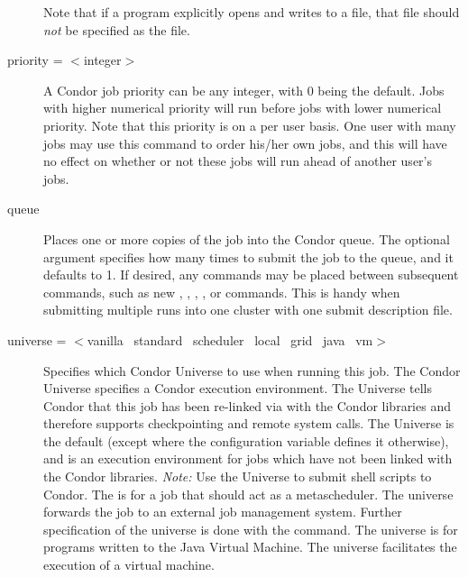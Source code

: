 \begin{description}
Note that if a program explicitly opens and writes to a file,
that file should \emph{not} be specified as the  file.


\item[priority = $<$integer$>$] 
\label{man-condor-submit-priority}
A Condor job priority 
can be any integer, with 0 being the default.
Jobs with higher numerical priority will
run before jobs with lower numerical priority. Note that this priority
is on a per user basis.
One user with many jobs may use this command
to order his/her own jobs,
and this will have no effect on whether or
not these jobs will run ahead of another user's jobs.


\item[queue \oOptnm{number-of-procs}] Places one or more
\label{man-condor-submit-queue}
copies of the job into the Condor queue.
The optional
argument  specifies how many times to submit the
job to the queue, and it defaults to 1.
If desired, any commands may be placed
between subsequent  commands, such as new ,
, , ,
or  commands.
This is handy when submitting multiple runs into one cluster with
one submit description file.


\item[universe = $<$vanilla \Bar\ standard \Bar\ scheduler
\Bar\ local \Bar\ grid \Bar\ java \Bar\ vm$>$]
\label{man-condor-submit-universe}
Specifies which Condor Universe to use when running this job.  The Condor
Universe specifies a Condor execution environment.
The  Universe tells Condor that this job has been
re-linked via  with the Condor libraries and therefore
supports checkpointing and remote system calls.
The  Universe is the default (except where the
configuration variable  defines it
otherwise), and is an execution environment for jobs which have not
been linked with the Condor libraries.  \emph{Note:} Use the
 Universe to submit shell scripts to Condor.
The  is for a job that
should act as a metascheduler.
The  universe forwards the job to an external job
management system.
Further specification of the  universe is done with the
 command.
The  universe is for programs written to the Java Virtual Machine.
The  universe facilitates the execution of a virtual
machine.


\end{description}
